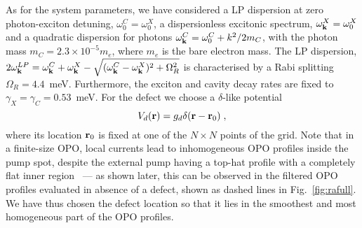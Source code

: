 As for the system parameters, we have considered a LP dispersion at
zero photon-exciton detuning, $\omega^C_0 = \omega^X_0$, a
dispersionless excitonic spectrum, $\omega^X_{\mathbf{k}} = \omega^X_0$
and a quadratic dispersion for photons $\omega^C_{\mathbf{k}} =
\omega^C_0 + k^2/2m_C$, with the photon mass $m_C=2.3 \times 10^{-5}
m_e$, where $m_e$ is the bare electron mass. The LP dispersion, $2
\omega_{\mathbf{k}}^{LP} = \omega_{\mathbf{k}}^{C} + \omega_{\mathbf{k}}^{X}
- \sqrt{(\omega_{\mathbf{k}}^{C} - \omega_{\mathbf{k}}^{X})^2 +
  \Omega_R^2}$ is characterised by a Rabi splitting $\Omega_R =
4.4$~meV. Furthermore, the exciton and cavity decay rates are fixed to
$\gamma_X=\gamma_C=0.53$~meV.
%
For the defect we choose a $\delta$-like potential
%
\begin{equation}
  V_d(\mathbf{r}) = g_d \delta(\mathbf{r} - \mathbf{r}_0)\; ,
\end{equation}
%
where its location $\mathbf{r}_0$ is fixed at one of the $N \times N$
points of the grid.
%
Note that in a finite-size OPO, local currents lead to inhomogeneous
OPO profiles inside the pump spot, despite the external pump having
a top-hat profile with a completely flat inner
region~\cite{Marchetti_2010,9783642241857} --- as shown later, this
can be observed in the filtered OPO profiles evaluated in absence of a
defect, shown as dashed lines in Fig.~\ref{fig:rafull}.
%
We have thus chosen the defect location so that it lies in the
smoothest and most homogeneous part of the OPO profiles.

